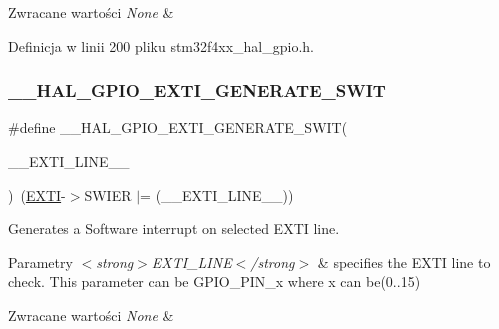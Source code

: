 \begin{DoxyRetVals}{Zwracane wartości}
{\em None} & \\
\hline
\end{DoxyRetVals}


Definicja w linii 200 pliku stm32f4xx\+\_\+hal\+\_\+gpio.\+h.

\mbox{\label{group___g_p_i_o___exported___macros_gac50aef6881e1f76032941ead9c9bce61}} 
\subsubsection{\texorpdfstring{\+\_\+\+\_\+\+H\+A\+L\+\_\+\+G\+P\+I\+O\+\_\+\+E\+X\+T\+I\+\_\+\+G\+E\+N\+E\+R\+A\+T\+E\+\_\+\+S\+W\+IT}{\_\_HAL\_GPIO\_EXTI\_GENERATE\_SWIT}}
{\footnotesize\ttfamily \#define \+\_\+\+\_\+\+H\+A\+L\+\_\+\+G\+P\+I\+O\+\_\+\+E\+X\+T\+I\+\_\+\+G\+E\+N\+E\+R\+A\+T\+E\+\_\+\+S\+W\+IT(\begin{DoxyParamCaption}\item[{}]{\+\_\+\+\_\+\+E\+X\+T\+I\+\_\+\+L\+I\+N\+E\+\_\+\+\_\+ }\end{DoxyParamCaption})~(\hyperlink{group___peripheral__declaration_ga9189e770cd9b63dadd36683eb9843cac}{E\+X\+TI}-\/$>$S\+W\+I\+ER $\vert$= (\+\_\+\+\_\+\+E\+X\+T\+I\+\_\+\+L\+I\+N\+E\+\_\+\+\_\+))}



Generates a Software interrupt on selected E\+X\+TI line. 


\begin{DoxyParams}{Parametry}
{\em $<$strong$>$\+E\+X\+T\+I\+\_\+\+L\+I\+N\+E$<$/strong$>$} & specifies the E\+X\+TI line to check. This parameter can be G\+P\+I\+O\+\_\+\+P\+I\+N\+\_\+x where x can be(0..15) \\
\hline
\end{DoxyParams}

\begin{DoxyRetVals}{Zwracane wartości}
{\em None} & \\
\hline
\end{DoxyRetVals}



